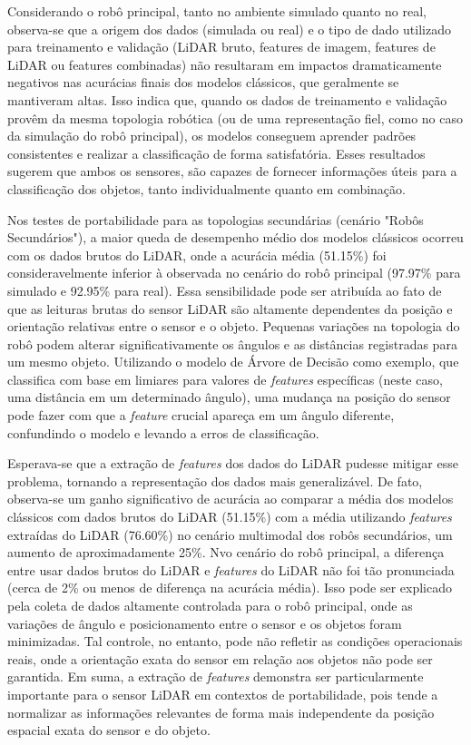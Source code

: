 Considerando o robô principal, tanto no ambiente simulado quanto no real, observa-se que a origem dos dados (simulada ou real) e o tipo de dado utilizado para treinamento e validação (LiDAR bruto, features de imagem, features de LiDAR ou features combinadas) não resultaram em impactos dramaticamente negativos nas acurácias finais dos modelos clássicos, que geralmente se mantiveram altas. Isso indica que, quando os dados de treinamento e validação provêm da mesma topologia robótica (ou de uma representação fiel, como no caso da simulação do robô principal), os modelos conseguem aprender padrões consistentes e realizar a classificação de forma satisfatória. Esses resultados sugerem que ambos os sensores, são capazes de fornecer informações úteis para a classificação dos objetos, tanto individualmente quanto em combinação.

Nos testes de portabilidade para as topologias secundárias (cenário "Robôs Secundários"), a maior queda de desempenho médio dos modelos clássicos ocorreu com os dados brutos do LiDAR, onde a acurácia média (51.15\%) foi consideravelmente inferior à observada no cenário do robô principal (97.97\% para simulado e 92.95\% para real). Essa sensibilidade pode ser atribuída ao fato de que as leituras brutas do sensor LiDAR são altamente dependentes da posição e orientação relativas entre o sensor e o objeto. Pequenas variações na topologia do robô podem alterar significativamente os ângulos e as distâncias registradas para um mesmo objeto. Utilizando o modelo de Árvore de Decisão como exemplo, que classifica com base em limiares para valores de \textit{features} específicas (neste caso, uma distância em um determinado ângulo), uma mudança na posição do sensor pode fazer com que a \textit{feature} crucial apareça em um ângulo diferente, confundindo o modelo e levando a erros de classificação.

Esperava-se que a extração de \textit{features} dos dados do LiDAR pudesse mitigar esse problema, tornando a representação dos dados mais generalizável. De fato, observa-se um ganho significativo de acurácia ao comparar a média dos modelos clássicos com dados brutos do LiDAR (51.15\%) com a média utilizando \textit{features} extraídas do LiDAR (76.60\%) no cenário multimodal dos robôs secundários, um aumento de aproximadamente 25\%. Nvo cenário do robô principal, a diferença entre usar dados brutos do LiDAR e \textit{features} do LiDAR não foi tão pronunciada (cerca de 2\% ou menos de diferença na acurácia média). Isso pode ser explicado pela coleta de dados altamente controlada para o robô principal, onde as variações de ângulo e posicionamento entre o sensor e os objetos foram minimizadas. Tal controle, no entanto, pode não refletir as condições operacionais reais, onde a orientação exata do sensor em relação aos objetos não pode ser garantida. Em suma, a extração de \textit{features} demonstra ser particularmente importante para o sensor LiDAR em contextos de portabilidade, pois tende a normalizar as informações relevantes de forma mais independente da posição espacial exata do sensor e do objeto.

